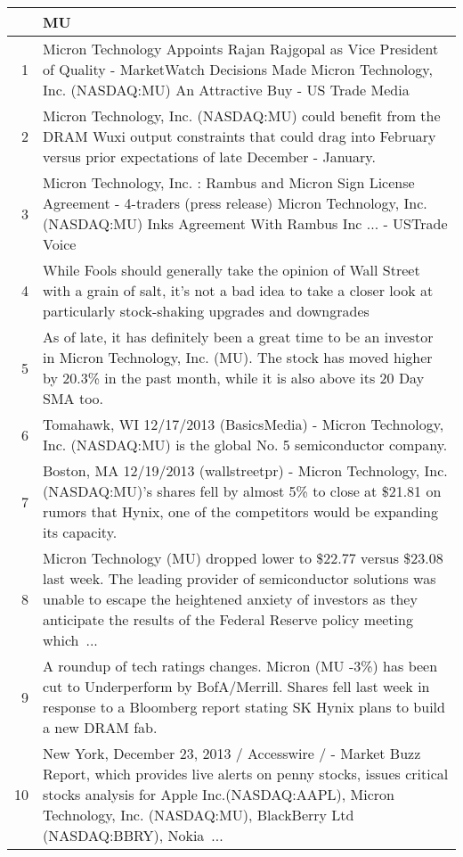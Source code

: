 \documentclass{tufte-handout}\usepackage[]{graphicx}\usepackage[]{color}
\begin{document}
\begin{tabularx}{\textwidth}{rX}
  \hline
 & MU \\ 
  \hline
1 &  Micron Technology Appoints Rajan Rajgopal as Vice President of Quality  -  MarketWatch Decisions Made Micron Technology, Inc. (NASDAQ:MU) An Attractive Buy  -  US Trade Media \\ 
  2 &  Micron Technology, Inc. (NASDAQ:MU) could benefit from the DRAM Wuxi output constraints that could drag into February versus prior expectations of late December - January.  \\ 
  3 &  Micron Technology, Inc. : Rambus and Micron Sign License Agreement  -  4-traders (press release) Micron Technology, Inc. (NASDAQ:MU) Inks Agreement With Rambus Inc ...  -  USTrade Voice \\ 
  4 &  While Fools should generally take the opinion of Wall Street with a grain of salt, it's not a bad idea to take a closer look at particularly stock-shaking upgrades and downgrades  \\ 
  5 &  As of late, it has definitely been a great time to be an investor in Micron Technology, Inc. (MU). The stock has moved higher by 20.3\% in the past month, while it is also above its 20 Day SMA too.  \\ 
  6 &  Tomahawk, WI 12/17/2013 (BasicsMedia) - Micron Technology, Inc. (NASDAQ:MU) is the global No. 5 semiconductor company.  \\ 
  7 &  Boston, MA 12/19/2013 (wallstreetpr) - Micron Technology, Inc. (NASDAQ:MU)'s shares fell by almost 5\% to close at \$21.81 on rumors that Hynix, one of the competitors would be expanding its capacity.  \\ 
  8 &  Micron Technology (MU) dropped lower to \$22.77 versus \$23.08 last week. The leading provider of semiconductor solutions was unable to escape the heightened anxiety of investors as they anticipate the results of the Federal Reserve policy meeting which ...  \\ 
  9 &  A roundup of tech ratings changes. Micron (MU -3\%) has been cut to Underperform by BofA/Merrill. Shares fell last week in response to a Bloomberg report stating SK Hynix plans to build a new DRAM fab.  \\ 
  10 &  New York, December 23, 2013 / Accesswire / - Market Buzz Report, which provides live alerts on penny stocks, issues critical stocks analysis for Apple Inc.(NASDAQ:AAPL), Micron Technology, Inc. (NASDAQ:MU), BlackBerry Ltd (NASDAQ:BBRY), Nokia ...  \\ 
   \hline
\end{tabularx}
\end{document}
